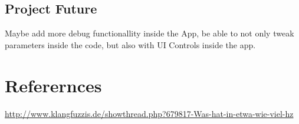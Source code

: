 \documentclass
[
 12pt, %
       DIV12,
       a4paper,
       oneside,
       titlepage,
       parskip=half,
       headings=normal,
       listof=totoc,
       bibliography=totoc,
       index=totoc,
       captions=tableheading,
       ]{scrreprt}
\begin{document}
\section{Project Future}
\label{sec:orgeb9e4a8}
Maybe add more debug functionallity inside the App, be able to not only tweak
parameters inside the code, but also with UI Controls inside the app.



\chapter{Referernces}
\label{sec:orgdc7d373}
\url{http://www.klangfuzzis.de/showthread.php?679817-Was-hat-in-etwa-wie-viel-hz}
\end{document}
